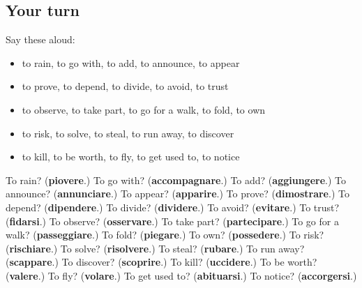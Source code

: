\subsection*{Your turn}
Say these aloud:

\begin{itemize}
\raggedright
  \item to rain, to go with, to add, to announce, to appear
  \item to prove, to depend, to divide, to avoid, to trust
  \item to observe, to take part, to go for a walk, to fold, to own
  \item to risk, to solve, to steal, to run away, to discover
  \item to kill, to be worth, to fly, to get used to, to notice
\end{itemize}

\begin{tcolorbox}[breakable,colback=teal!4,colframe=teal!35!black,title={Before you move on}]
To rain? (\textbf{piovere}.) To go with? (\textbf{accompagnare}.) To add? (\textbf{aggiungere}.) To announce? (\textbf{annunciare}.) To appear? (\textbf{apparire}.) To prove? (\textbf{dimostrare}.) To depend? (\textbf{dipendere}.) To divide? (\textbf{dividere}.) To avoid? (\textbf{evitare}.) To trust? (\textbf{fidarsi}.) To observe? (\textbf{osservare}.) To take part? (\textbf{partecipare}.) To go for a walk? (\textbf{passeggiare}.) To fold? (\textbf{piegare}.) To own? (\textbf{possedere}.) To risk? (\textbf{rischiare}.) To solve? (\textbf{risolvere}.) To steal? (\textbf{rubare}.) To run away? (\textbf{scappare}.) To discover? (\textbf{scoprire}.) To kill? (\textbf{uccidere}.) To be worth? (\textbf{valere}.) To fly? (\textbf{volare}.) To get used to? (\textbf{abituarsi}.) To notice? (\textbf{accorgersi}.)
\end{tcolorbox}
